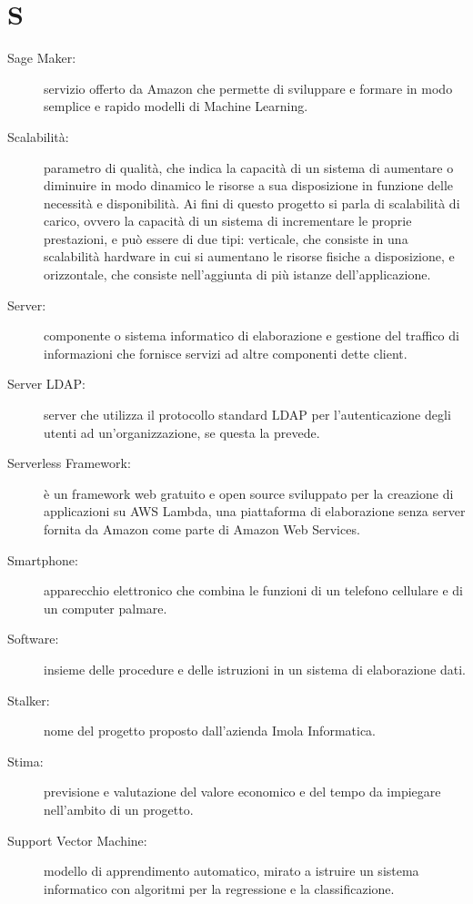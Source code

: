 \documentclass{article}
\begin{document}
	\section{S}
	\begin{description}
		\item[Sage Maker:] servizio offerto da Amazon che permette di sviluppare e formare in modo semplice e rapido modelli di Machine Learning.
		\item[Scalabilità:] parametro di qualità, che indica la capacità di un sistema di aumentare o diminuire in modo dinamico le risorse a sua disposizione in funzione delle necessità e disponibilità. Ai fini di questo progetto si parla di scalabilità di carico, ovvero la capacità di un sistema di incrementare le proprie prestazioni, e può essere di due tipi: verticale, che consiste in una scalabilità hardware in cui si aumentano le risorse fisiche a disposizione, e orizzontale, che consiste nell’aggiunta di più istanze dell’applicazione.
		\item[Server:] componente o sistema informatico di elaborazione e gestione del traffico di informazioni che fornisce servizi ad altre componenti dette client.
		\item[Server LDAP:] server che utilizza il protocollo standard LDAP per l'autenticazione degli utenti ad un'organizzazione, se questa la prevede.
		\item[Serverless Framework:] è un framework web gratuito e open source sviluppato per la creazione di applicazioni su AWS Lambda, una piattaforma di elaborazione senza server fornita da Amazon come parte di Amazon Web Services.
		\item[Smartphone:] apparecchio elettronico che combina le funzioni di un telefono cellulare e di un computer palmare.
		\item[Software:] insieme delle procedure e delle istruzioni in un sistema di elaborazione dati.
		\item[Stalker:] nome del progetto proposto dall'azienda Imola Informatica.
		\item[Stima:] previsione e valutazione del valore economico e del tempo da impiegare nell'ambito di un progetto.
		\item[Support Vector Machine:] modello di apprendimento automatico, mirato a istruire un sistema informatico con algoritmi per la regressione e la classificazione.
	\end{description}
	\newpage
\end{document}

